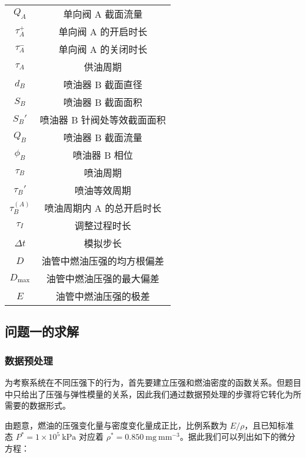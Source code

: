 \documentclass[withoutpreface,bwprint]{cumcmthesis}
\newcommand{\prb}{\times 10^5~\mathrm{kPa}}
\newcommand{\den}{~\mathrm{mg~mm^{-3}}}
\begin{document}
\begin{table}[!ht]
\begin{minipage}{\textwidth}
\begin{minipage}[t]{0.5\textwidth}
\begin{tabular}{cc}
        $Q_A$          & 单向阀 A 截面流量       \\
        $\tau_A^+$     & 单向阀 A 的开启时长     \\
        $\tau_A^-$     & 单向阀 A 的关闭时长     \\
        $\tau_A$       & 供油周期       \\
        $d_B$          & 喷油器 B 截面直径       \\
        $S_B$          & 喷油器 B 截面面积       \\
        $S_B'$          & 喷油器 B 针阀处等效截面面积      \\
		$Q_B$          & 喷油器 B 截面流量      \\
		$\phi_B$         & 喷油器 B 相位  \\
        $\tau_B$       & 喷油周期       \\
        $\tau_B'$       & 喷油等效周期       \\
		$\tau_B^{(A)}$       & 喷油周期内 A 的总开启时长  \\
		$\tau_I$     &       调整过程时长 \\
		$\Delta t$ & 模拟步长 \\
		$D$            & 油管中燃油压强的均方根偏差 \\
		$D_{\max}$    & 油管中燃油压强的最大偏差  \\
		$E$     & 油管中燃油压强的极差 \\
		\bottomrule
        \end{tabular}
        \end{minipage}
    \end{minipage}
\end{table}



\newpage
\subsection{问题一的求解}

\subsubsection{数据预处理}

为考察系统在不同压强下的行为，首先要建立压强和燃油密度的函数关系。但题目中只给出了压强与弹性模量的关系，因此我们通过数据预处理的步骤将它转化为所需要的数据形式。

由题意，燃油的压强变化量与密度变化量成正比，比例系数为 $E/\rho$，且已知标准态 $P^*=1\prb$ 对应着 $\rho^* = 0.850\den$。据此我们可以列出如下的微分方程：
\end{document}
